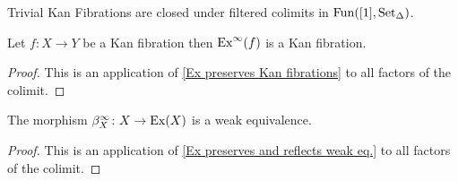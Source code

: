 \begin{prop}
Trivial Kan Fibrations are closed under filtered colimits in $\operatorname{Fun}([1], \operatorname{Set}_{\Delta})$.
\end{prop}

\begin{prop}
    Let $f \colon X \to Y$ be a Kan fibration then $\text{Ex}^\infty(f)$ is a Kan fibration.
\end{prop}

\begin{proof}
    This is an application of \cref{Ex preserves Kan fibrations} to all factors of the colimit.
\end{proof}

\begin{cor}
    The morphism $\beta_X^\infty \colon X  \to \operatorname{Ex}(X)$ is a weak equivalence.
\end{cor}

\begin{proof}
    This is an application of \cref{Ex preserves and reflects weak eq.} to all factors of the colimit.
\end{proof}


